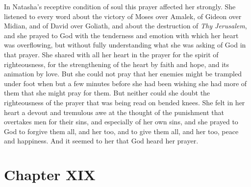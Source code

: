 In Natasha's receptive condition of soul this prayer affected her
strongly. She listened to every word about the victory of Moses
over Amalek, of Gideon over Midian, and of David over Goliath,
and about the destruction of \emph{Thy Jerusalem}, and she prayed
to God with the tenderness and emotion with which her heart was
overflowing, but without fully understanding what she was asking
of God in that prayer. She shared with all her heart in the
prayer for the spirit of righteousness, for the strengthening of
the heart by faith and hope, and its animation by love. But she
could not pray that her enemies might be trampled under foot when
but a few minutes before she had been wishing she had more of
them that she might pray for them. But neither could she doubt
the righteousness of the prayer that was being read on bended
knees. She felt in her heart a devout and tremulous awe at the
thought of the punishment that overtakes men for their sins, and
especially of her own sins, and she prayed to God to forgive them
all, and her too, and to give them all, and her too, peace and
happiness. And it seemed to her that God heard her prayer.


\chapter*{Chapter XIX}
\ifaudio     
{} 
\fi

